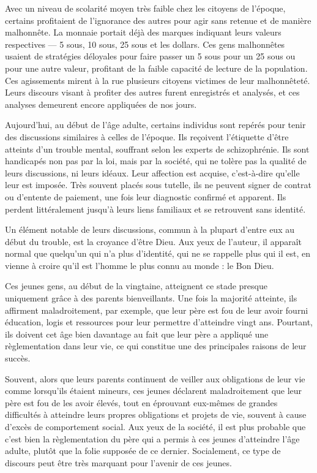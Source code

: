 \documentclass[12pt,oneside]{article}
\begin{document}
Avec un niveau de scolarité moyen très faible chez les citoyens de l'époque, certains profitaient de l'ignorance des autres pour agir sans retenue et de manière malhonnête. La monnaie portait déjà des marques indiquant leurs valeurs respectives --- 5 sous, 10 sous, 25 sous et les dollars. Ces gens malhonnêtes usaient de stratégies déloyales pour faire passer un 5 sous pour un 25 sous ou pour une autre valeur, profitant de la faible capacité de lecture de la population. Ces agissements mirent à la rue plusieurs citoyens victimes de leur malhonnêteté. Leurs discours visant à profiter des autres furent enregistrés et analysés, et ces analyses demeurent encore appliquées de nos jours.

Aujourd'hui, au début de l'âge adulte, certains individus sont repérés pour tenir des discussions similaires à celles de l'époque. Ils reçoivent l'étiquette d'être atteints d'un trouble mental, souffrant selon les experts de schizophrénie. Ils sont handicapés non pas par la loi, mais par la société, qui ne tolère pas la qualité de leurs discussions, ni leurs idéaux. Leur affection est acquise, c'est-à-dire qu'elle leur est imposée. Très souvent placés sous tutelle, ils ne peuvent signer de contrat ou d'entente de paiement, une fois leur diagnostic confirmé et apparent. Ils perdent littéralement jusqu'à leurs liens familiaux et se retrouvent sans identité.

Un élément notable de leurs discussions, commun à la plupart d'entre eux au début du trouble, est la croyance d'être Dieu. Aux yeux de l'auteur, il apparaît normal que quelqu'un qui n'a plus d'identité, qui ne se rappelle plus qui il est, en vienne à croire qu'il est l'homme le plus connu au monde : le Bon Dieu.

Ces jeunes gens, au début de la vingtaine, atteignent ce stade presque uniquement grâce à des parents bienveillants. Une fois la majorité atteinte, ils affirment maladroitement, par exemple, que leur père est fou de leur avoir fourni éducation, logis et ressources pour leur permettre d'atteindre vingt ans. Pourtant, ils doivent cet âge bien davantage au fait que leur père a appliqué une règlementation dans leur vie, ce qui constitue une des principales raisons de leur succès.

Souvent, alors que leurs parents continuent de veiller aux obligations de leur vie comme lorsqu'ils étaient mineurs, ces jeunes déclarent maladroitement que leur père est fou de les avoir élevés, tout en éprouvant eux-mêmes de grandes difficultés à atteindre leurs propres obligations et projets de vie, souvent à cause d'excès de comportement social. Aux yeux de la société, il est plus probable que c'est bien la règlementation du père qui a permis à ces jeunes d'atteindre l'âge adulte, plutôt que la folie supposée de ce dernier. Socialement, ce type de discours peut être très marquant pour l'avenir de ces jeunes.
\end{document}
